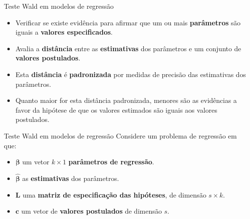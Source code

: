 \documentclass[
  ignorenonframetext,
  serif,
  professionalfont,
  usenames,
  dvipsnames,
  aspectratio = 169]{beamer}
\begin{document}
\begin{frame}{Teste Wald em modelos de regressão}
\protect\hypertarget{teste-wald-em-modelos-de-regressuxe3o}{}
\begin{itemize}
  \itemsep 2ex

  \item Verificar se existe evidência para afirmar que um ou mais \textbf{parâmetros} são iguais a \textbf{valores especificados}.
  
  \item Avalia a \textbf{distância} entre as \textbf{estimativas} dos parâmetros e um conjunto de \textbf{valores postulados}.
  
  \item Esta \textbf{distância} é \textbf{padronizada} por medidas de precisão das estimativas dos parâmetros. 

  \item Quanto maior for esta distância padronizada, menores são as evidências a favor da hipótese de que os valores estimados são iguais aos valores postulados.


  \end{itemize}
\end{frame}

\begin{frame}{Teste Wald em modelos de regressão}
\protect\hypertarget{teste-wald-em-modelos-de-regressuxe3o-1}{}
Considere um problema de regressão em que:

\begin{itemize}

  \itemsep 2ex
  
  \item $\boldsymbol{\beta}$ um vetor $k\times1$ \textbf{parâmetros de regressão}.
    
  \item $\boldsymbol{\hat\beta}$ as \textbf{estimativas} dos parâmetros.
    
  \item $\boldsymbol{L}$ uma \textbf{matriz de especificação das hipóteses}, de dimensão $s \times k$.  
  
  \item $\boldsymbol{c}$ um vetor de \textbf{valores postulados} de dimensão $s$.
    
  \end{itemize}
\end{frame}
\end{document}
